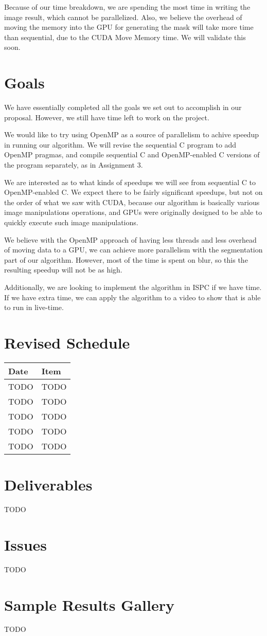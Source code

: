 \documentclass[12pt]{article}
\begin{document}
Because of our time breakdown, we are spending the most time in writing the
image result, which cannot be parallelized. Also, we believe the overhead of
moving the memory into the GPU for generating the mask will take more time than
sequential, due to the CUDA Move Memory time. We will validate this soon.

\section{Goals}

We have essentially completed all the goals we set out to accomplish in our
proposal. However, we still have time left to work on the project.

We would like to try using OpenMP as a source of parallelism to achive speedup
in running our algorithm. We will revise the sequential C program to add OpenMP
pragmas, and compile sequential C and OpenMP-enabled C versions of the program
separately, as in Assignment 3.

We are interested as to what kinds of speedups we will see from sequential C to
OpenMP-enabled C. We expect there to be fairly significant speedups, but not on
the order of what we saw with CUDA, because our algorithm is basically various
image manipulations operations, and GPUs were originally designed to be able to
quickly execute such image manipulations.

We believe with the OpenMP approach of having less threads and less overhead of
moving data to a GPU, we can achieve more parallelism with the segmentation
part of our algorithm. However, most of the time is spent on blur, so this the
resulting speedup will not be as high.

Additionally, we are looking to implement the algorithm in ISPC if we have time.
If we have extra time, we can apply the algorithm to a video to show that is
able to run in live-time.

\section{Revised Schedule}

\begin{tabular}{l|l}
    Date & Item \\
    \hline
    TODO & TODO \\
    TODO & TODO \\
    TODO & TODO \\
    TODO & TODO \\
    TODO & TODO
\end{tabular}

\section{Deliverables}

TODO

\section{Issues}

TODO

\section{Sample Results Gallery}

TODO
\end{document}
